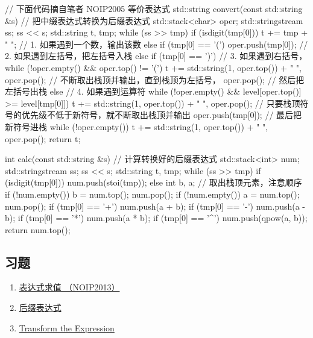 \begin{cppcode}
// 下面代码摘自笔者 NOIP2005 等价表达式
std::string convert(const std::string &s) {  // 把中缀表达式转换为后缀表达式
  std::stack<char> oper;
  std::stringstream ss;
  ss << s;
  std::string t, tmp;
  while (ss >> tmp) {
    if (isdigit(tmp[0]))
      t += tmp + " ";  // 1. 如果遇到一个数，输出该数
    else if (tmp[0] == '(')
      oper.push(tmp[0]);       // 2. 如果遇到左括号，把左括号入栈
    else if (tmp[0] == ')') {  // 3. 如果遇到右括号，
      while (!oper.empty() && oper.top() != '(')
        t += std::string(1, oper.top()) + " ",
            oper.pop();  // 不断取出栈顶并输出，直到栈顶为左括号，
      oper.pop();        // 然后把左括号出栈
    } else {             // 4. 如果遇到运算符
      while (!oper.empty() && level[oper.top()] >= level[tmp[0]])
        t += std::string(1, oper.top()) + " ",
            oper.pop();  // 只要栈顶符号的优先级不低于新符号，就不断取出栈顶并输出
      oper.push(tmp[0]);  // 最后把新符号进栈
    }
  }
  while (!oper.empty()) t += std::string(1, oper.top()) + " ", oper.pop();
  return t;
}

int calc(const std::string &s) {  // 计算转换好的后缀表达式
  std::stack<int> num;
  std::stringstream ss;
  ss << s;
  std::string t, tmp;
  while (ss >> tmp) {
    if (isdigit(tmp[0]))
      num.push(stoi(tmp));
    else {
      int b, a;  // 取出栈顶元素，注意顺序
      if (!num.empty()) b = num.top();
      num.pop();
      if (!num.empty()) a = num.top();
      num.pop();
      if (tmp[0] == '+') num.push(a + b);
      if (tmp[0] == '-') num.push(a - b);
      if (tmp[0] == '*') num.push(a * b);
      if (tmp[0] == '^') num.push(qpow(a, b));
    }
  }
  return num.top();
}
\end{cppcode}

\subsection{习题}

\begin{enumerate}
\item \href{https://www.luogu.org/problemnew/show/P1981}{表达式求值 （NOIP2013）}
\item \href{https://www.luogu.org/problemnew/show/P1449}{后缀表达式}
\item \href{https://www.spoj.com/problems/ONP/}{Transform the Expression}
\end{enumerate}

